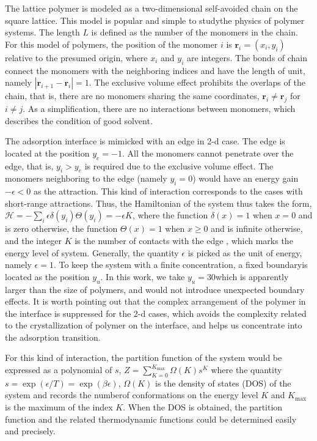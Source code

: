 \documentclass[aps,pre,twocolumn,showpacs,preprintnumbers,amsmath,amssymb]{revtex4-1}
\begin{document}

The lattice polymer is modeled as a two-dimensional self-avoided
chain on the square lattice. This model is popular and simple to
studythe physics of polymer systems. The length $L$ is defined
as the number of the monomers in the chain. For this model of
polymers, the position of the monomer $i$ is ${\mathbf
r}_i=(x_i,y_i)$ relative to the presumed origin, where $x_i$ and
$y_i$ are integers. The bonds of chain connect the monomers with
the neighboring indices and have the length of unit, namely
$|{\mathbf r}_{i+1}-{\mathbf r}_i|=1$. The exclusive volume
effect prohibits the overlaps of the chain, that is, there are
no monomers sharing the same coordinates, ${\mathbf r}_i\neq
{\mathbf r}_j$ for $i\neq j$. As a simplification, there are no
interactions between monomers, which describes the condition of
good solvent.

The adsorption interface is mimicked with an edge in 2-d case.
The edge is located at the position $y_e=-1$. All the monomers
cannot penetrate over the edge, that is, $y_i>y_e$ is required
due to the exclusive volume effect. The monomers neighboring to
the edge (namely $y_i=0$) would have an energy gain
$-\epsilon<0$ as the attraction. This kind of interaction
corresponds to the cases with short-range attractions. Thus, the
Hamiltonian of the system thus takes the form, ${\mathcal
H}=-\sum_i \epsilon \delta(y_i)\Theta(y_i) =-\epsilon K$, where
the function $\delta(x)=1$ when $x=0$ and is zero otherwise, the
function $\Theta(x)=1$ when $x\ge 0$ and is infinite otherwise,
and the integer $K$ is the number of contacts with the edge ,
which marks the energy level of system. Generally, the quantity
$\epsilon$ is picked as the unit of energy, namely $\epsilon=1$.
To keep the system with a finite concentration, a fixed
boundaryis located as the position $y_u$. In this work, we take
$y_u=30$which is apparently larger than the size of polymers,
and would not introduce unexpected boundary effects. It is worth
pointing out that the complex arrangement of the polymer in the
interface is suppressed for the 2-d cases, which avoids the
complexity related to the crystallization of polymer on the
interface, and helps us concentrate into the adsorption
transition.

For this kind of interaction, the partition function of the
system would be expressed as a polynomial of $s$,
$Z=\sum_{K=0}^{K_{\text{max}}} \Omega(K) s^K$ where the quantity
$s=\exp(\epsilon/T)=\exp(\beta\epsilon)$, $\Omega(K)$ is the
density of states (DOS) of the system and records the numberof
conformations on the energy level $K$ and $K_{\text{max}}$ is
the maximum of the index $K$. When the DOS is obtained, the
partition function and the related thermodynamic functions could
be determined easily and precisely.
\end{document}
